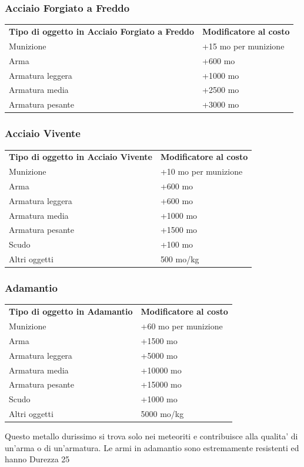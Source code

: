 \documentclass[a4paper,11pt,twoside,openany]{book}
\begin{document}
{\subsubsection{Acciaio Forgiato a Freddo}

\label{acciaio-forgiato-a-freddo}

\begin{tabular}{ll}
\toprule
\textbf{Tipo di oggetto in Acciaio Forgiato a Freddo} & \textbf{Modificatore al costo}\tabularnewline
Munizione & +15 mo per munizione\tabularnewline
Arma & +600 mo\tabularnewline
Armatura leggera & +1000 mo\tabularnewline
Armatura media & +2500 mo\tabularnewline
Armatura pesante & +3000 mo\tabularnewline
\end{tabular}

\subsubsection{Acciaio Vivente}

\label{acciaio-vivente}

\begin{tabular}{ll}
\toprule 
\textbf{Tipo di oggetto in Acciaio Vivente} & \textbf{Modificatore al costo}\tabularnewline
Munizione & +10 mo per munizione\tabularnewline
Arma & +600 mo\tabularnewline
Armatura leggera & +600 mo\tabularnewline
Armatura media & +1000 mo\tabularnewline
Armatura pesante & +1500 mo\tabularnewline
Scudo & +100 mo\tabularnewline
Altri oggetti & 500 mo/kg\tabularnewline
\end{tabular}

\subsubsection{Adamantio}

\label{adamantio}

\begin{tabular}{ll}
\toprule 
\textbf{Tipo di oggetto in Adamantio} & \textbf{Modificatore al costo}\tabularnewline
Munizione & +60 mo per munizione\tabularnewline
Arma & +1500 mo\tabularnewline
Armatura leggera & +5000 mo\tabularnewline
Armatura media & +10000 mo\tabularnewline
Armatura pesante & +15000 mo\tabularnewline
Scudo & +1000 mo\tabularnewline
Altri oggetti & 5000 mo/kg\tabularnewline
\end{tabular}

Questo metallo durissimo si trova solo nei meteoriti e contribuisce alla qualita' di un'arma o di un'armatura. Le armi in adamantio sono estremamente resistenti ed hanno Durezza 25

}
\end{document}
